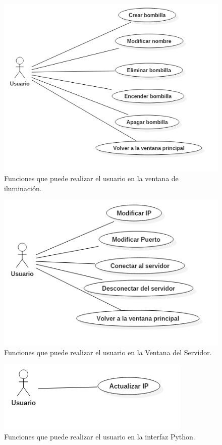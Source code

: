 \begin{figure}[h!]
	\centering
	\includegraphics[width=0.9\linewidth]{img/CDUVentanaIluminacion}
	\caption{Funciones que puede realizar el usuario en la ventana de iluminación.}
	\label{fig:CDUVentanaIluminacion}
\end{figure}

\newpage

\begin{figure}[h!]
	\centering
	\includegraphics[width=1\linewidth]{img/CDUVentanaServidor}
	\caption{Funciones que puede realizar el usuario en la Ventana del Servidor.}
	\label{fig:CDUVentanaServidor}
\end{figure}

\begin{figure}[h!]
	\centering
	\includegraphics[width=0.8\linewidth]{img/CDUInterfazPython}
	\caption{Funciones que puede realizar el usuario en la interfaz Python.}
	\label{fig:CDUInterfazPython}
\end{figure}

